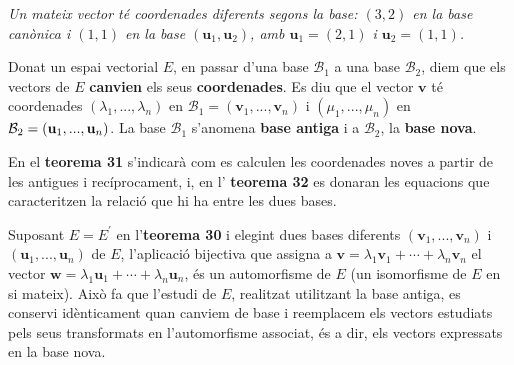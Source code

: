 \begin{center}
%

{\small\itshape Un mateix vector té coordenades diferents segons la base: $(3,2)$ en la base canònica i $(1,1)$ en la base $(\mathbf{u}_{1},\mathbf{u}_{2})$, amb $\mathbf{u}_{1}=(2,1)$ i $\mathbf{u}_{2}=(1,1)$.}
\end{center}

\begin{definicio}
Donat un espai vectorial $E$, en passar d’una base $\mathcal{B}%
_{1} $ a una base $\mathcal{B}_{2}$, diem que els vectors de $E$
\textbf{canvien} els seus \textbf{coordenades}. Es diu que el vector $\mathbf{v}$
té coordenades $(\lambda _{1},...,\lambda _{n})$ en $\mathcal{B}_{1}=(%
\mathbf{v}_{1},...,\mathbf{v}_{n})$ i $(\mu _{1},...,\mu _{n})$ en $\mathcal{%
B}_{2}=(\mathbf{u}_{1},...,\mathbf{u}_{n})$. La base $\mathcal{B}_{1}$ s'anomena \textbf{base antiga} i a $\mathcal{B}_{2}$, la \textbf{base nova}.

En el \textbf{teorema 31} s’indicarà com es calculen les
coordenades noves a partir de les antigues i recíprocament, i, en l’
\textbf{teorema 32} es donaran les equacions que caracteritzen la relació que hi ha entre les dues bases.
\end{definicio}

\begin{observacio}
Suposant $E=E^{\prime }$ en l’\textbf{teorema 30} i
elegint dues bases diferents $(\mathbf{v}_{1},...,\mathbf{v}_{n})$ i $(%
\mathbf{u}_{1},...,\mathbf{u}_{n})$ de $E$, l’aplicació
bijectiva que assigna a $\mathbf{v}=\lambda _{1}\mathbf{v}_{1}+\cdots
+\lambda _{n}\mathbf{v}_{n}$ el vector $\mathbf{w}=\lambda _{1}\mathbf{u}%
_{1}+\cdots +\lambda _{n}\mathbf{u}_{n}$, és un automorfisme de $E$
(un isomorfisme de $E$ en si mateix). Això fa que l'estudi
de $E$, realitzat utilitzant la base antiga, es conservi idènticament quan canviem de base i reemplacem els vectors estudiats
pels seus transformats en l'automorfisme associat, és a dir, els vectors
expressats en la base nova.
\end{observacio}

